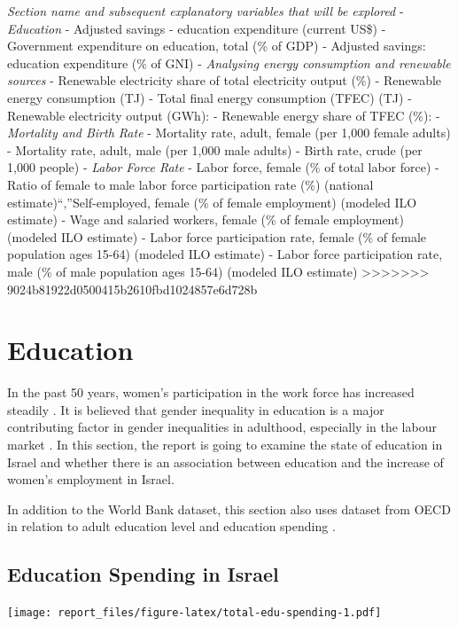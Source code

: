 \documentclass[11pt,a4paper,]{article}
\let\origfigure\figure
\let\endorigfigure\endfigure
\renewenvironment{figure}[1][2] {
    \expandafter\origfigure\expandafter[H]
} {
    \endorigfigure
}%
\begin{document}
\emph{Section name and subsequent explanatory variables that will be explored}
- \emph{Education}
- Adjusted savings - education expenditure (current US\$)
- Government expenditure on education, total (\% of GDP)
- Adjusted savings: education expenditure (\% of GNI)
- \emph{Analysing energy consumption and renewable sources}
- Renewable electricity share of total electricity output (\%)
- Renewable energy consumption (TJ)
- Total final energy consumption (TFEC) (TJ)
- Renewable electricity output (GWh):
- Renewable energy share of TFEC (\%):
- \emph{Mortality and Birth Rate}
- Mortality rate, adult, female (per 1,000 female adults)
- Mortality rate, adult, male (per 1,000 male adults)
- Birth rate, crude (per 1,000 people)
- \emph{Labor Force Rate}
- Labor force, female (\% of total labor force)
- Ratio of female to male labor force participation rate (\%) (national estimate)``,''Self-employed, female (\% of female employment) (modeled ILO estimate)
- Wage and salaried workers, female (\% of female employment) (modeled ILO estimate)
- Labor force participation rate, female (\% of female population ages 15-64) (modeled ILO estimate)
- Labor force participation rate, male (\% of male population ages 15-64) (modeled ILO estimate)
>>>>>>> 9024b81922d0500415b2610fbd1024857e6d728b

\section*{Education}

In the past 50 years, women's participation in the work force has increased steadily \autocite{stier2000women}. It is believed that gender inequality in education is a major contributing factor in gender inequalities in adulthood, especially in the labour market \autocite{marks2008accounting}. In this section, the report is going to examine the state of education in Israel and whether there is an association between education and the increase of women's employment in Israel.

In addition to the World Bank dataset, this section also uses dataset from OECD in relation to adult education level \autocite{edulevel} and education spending \autocite{eduspend}.

\subsection*{Education Spending in Israel}

\begin{figure}
\centering
\texttt{[image: report\_files/figure-latex/total-edu-spending-1.pdf]}
\caption{\label{fig:total-edu-spending}Average Education Expenditure in Israel by Decades}
\end{figure}
\end{document}
